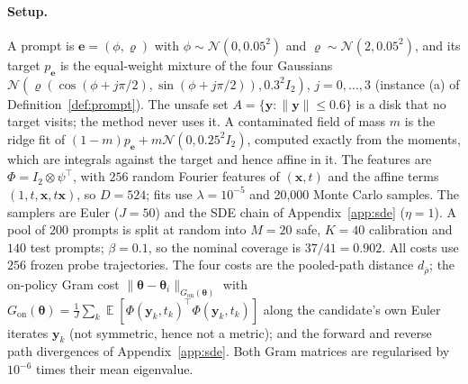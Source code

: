 \documentclass{article}
\DeclareMathOperator{\E}{\mathbb{E}}
\newcommand{\cN}{\mathcal{N}}
\newcommand{\bth}{\boldsymbol{\theta}}
\newcommand{\bx}{\mathbf{x}}
\newcommand{\by}{\mathbf{y}}
\newcommand{\be}{\mathbf{e}}
\theoremstyle{plain}
\theoremstyle{remark}
\begin{document}
\paragraph{Setup.}
A prompt is $\be=(\phi,\varrho)$ with $\phi\sim\cN(0,0.05^2)$ and $\varrho\sim\cN(2,0.05^2)$, and its target $p_{\be}$ is the
equal-weight mixture of the four Gaussians $\cN(\varrho(\cos(\phi+j\pi/2),\sin(\phi+j\pi/2)),0.3^2I_2)$,
$j=0,\dots,3$ (instance (a) of Definition~\ref{def:prompt}). The unsafe set $A=\{\by:\|\by\|\le0.6\}$ is a
disk that no target visits; the method never uses it. A contaminated field of mass $m$ is the
ridge fit of $(1-m)p_{\be}+m\cN(0,0.25^2I_2)$, computed exactly from the moments, which are integrals
against the target and hence affine in it. The features are $\Phi=I_2\otimes\psi^\top$, with $256$ random Fourier features of $(\bx,t)$
and the affine terms $(1,t,\bx,t\bx)$, so $D=524$; fits use $\lambda=10^{-5}$ and 20,000 Monte Carlo
samples. The samplers are Euler ($J=50$) and the SDE chain of Appendix~\ref{app:sde} ($\eta=1$). A pool
of $200$ prompts is split at random into $M=20$ safe, $K=40$ calibration and $140$ test prompts;
$\beta=0.1$, so the nominal coverage is $37/41=0.902$. All costs use $256$ frozen probe trajectories.
The four costs are the pooled-path distance $d_{\bar\rho}$; the on-policy Gram cost
$\|\bth-\bth_i\|_{G_{\mathrm{on}}(\bth)}$ with $G_{\mathrm{on}}(\bth)=\frac1J\sum_k\E[\Phi(\by_k,t_k)^\top\Phi(\by_k,t_k)]$ along the
candidate's own Euler iterates $\by_k$ (not symmetric, hence not a metric); and the forward and
reverse path divergences of Appendix~\ref{app:sde}. Both Gram matrices are regularised by
$10^{-6}$ times their mean eigenvalue.
\end{document}
